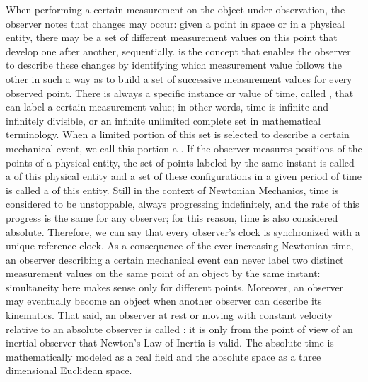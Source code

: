 When performing a certain measurement on the object under observation, the observer notes that changes may occur: given a point in space or in a physical entity, there may be a set of different measurement values on this point that develop one after another, sequentially.  is the concept that enables the observer to describe these changes by identifying which measurement value follows the other in such a way as to build a set of successive measurement values for every observed point. There is always a specific instance or value of time, called , that can label a certain measurement value; in other words, time is infinite and infinitely divisible, or an infinite unlimited complete set in mathematical terminology. When a limited portion of this set is selected to describe a certain mechanical event, we call this portion a . If the observer measures positions of the points of a physical entity, the set of points labeled by the same instant is called a  of this physical entity and a set of these configurations in a given period of time is called a  of this entity. Still in the context of Newtonian Mechanics, time is considered to be unstoppable, always progressing indefinitely, and the rate of this progress is the same for any observer; for this reason, time is also considered absolute. Therefore, we can say that every observer's clock is synchronized with a unique reference clock. As a consequence of the ever increasing Newtonian time, an observer describing a certain mechanical event can never label two distinct measurement values on the same point of an object by the same instant: simultaneity here makes sense only for different points. Moreover, an observer may eventually become an object when another observer can describe its kinematics. That said, an observer at rest or moving with constant velocity relative to an absolute observer is called : it is only from the point of view of an inertial observer that Newton's Law of Inertia is valid. The absolute time is mathematically modeled as a real field and the absolute space as a three dimensional Euclidean space.   


